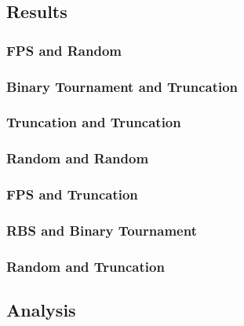 \documentclass[11pt, letterpaper]{article}
\begin{document}
\subsection{Results} 
\subsubsection {FPS and Random}
\subsubsection {Binary Tournament and Truncation}
\subsubsection {Truncation and Truncation}
\subsubsection {Random and Random}
\subsubsection {FPS and Truncation}
\subsubsection {RBS and Binary Tournament}
\subsubsection {Random and Truncation}
\subsection{Analysis}
\end{document}
